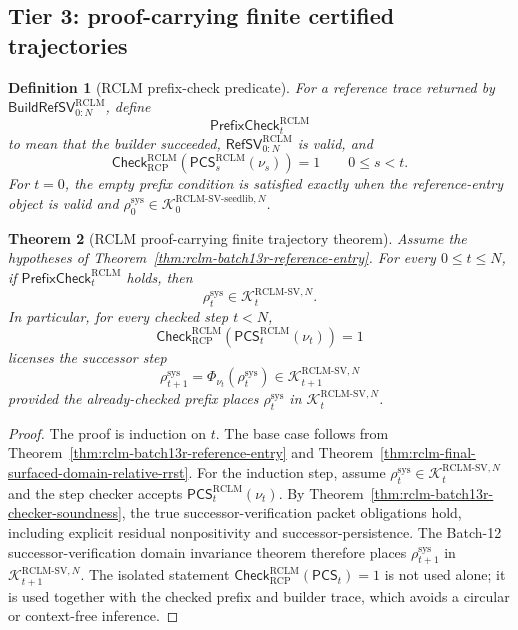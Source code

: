 \documentclass[11pt,a4paper]{article}
\newtheorem{theorem}{Theorem}[section]
\newtheorem{definition}[theorem]{Definition}
\newcommand{\Kcal}{\mathcal K}
\newcommand{\RCP}{\mathrm{RCP}}
\newcommand{\RCLM}{\mathrm{RCLM}}
\newcommand{\sys}{\mathrm{sys}}
\begin{document}
\subsection{Tier 3: proof-carrying finite certified trajectories}

\begin{definition}[RCLM prefix-check predicate]
\label{def:rclm-batch13r-prefix-check}
For a reference trace returned by \(\mathsf{BuildRefSV}_{0:N}^{\RCLM}\), define
\[
\mathsf{PrefixCheck}_t^{\RCLM}
\]
to mean that the builder succeeded, \(\mathsf{RefSV}_{0:N}^{\RCLM}\) is valid, and
\[
\mathsf{Check}_{\RCP}^{\RCLM}(\mathsf{PCS}_s^{\RCLM}(\nu_s))=1
\qquad
0\le s<t.
\]
For \(t=0\), the empty prefix condition is satisfied exactly when the reference-entry object is valid and \(\rho_0^{\sys}\in\Kcal_0^{\RCLM\text{-}\mathrm{SV\mbox{-}seedlib},N}\).
\end{definition}

\begin{theorem}[RCLM proof-carrying finite trajectory theorem]
\label{thm:rclm-batch13r-proof-carrying-finite-trajectory}
Assume the hypotheses of Theorem~\ref{thm:rclm-batch13r-reference-entry}.  For every \(0\le t\le N\), if \(\mathsf{PrefixCheck}_t^{\RCLM}\) holds, then
\[
\rho_t^{\sys}
\in
\Kcal_t^{\RCLM\text{-}\mathrm{SV},N}.
\]
In particular, for every checked step \(t<N\),
\[
\mathsf{Check}_{\RCP}^{\RCLM}(\mathsf{PCS}_t^{\RCLM}(\nu_t))=1
\]
licenses the successor step
\[
\rho_{t+1}^{\sys}=\Phi_{\nu_t}(\rho_t^{\sys})
\in
\Kcal_{t+1}^{\RCLM\text{-}\mathrm{SV},N}
\]
provided the already-checked prefix places \(\rho_t^{\sys}\) in \(\Kcal_t^{\RCLM\text{-}\mathrm{SV},N}\).
\end{theorem}

\begin{proof}
The proof is induction on \(t\).  The base case follows from Theorem~\ref{thm:rclm-batch13r-reference-entry} and Theorem~\ref{thm:rclm-final-surfaced-domain-relative-rrst}.  For the induction step, assume \(\rho_t^{\sys}\in\Kcal_t^{\RCLM\text{-}\mathrm{SV},N}\) and the step checker accepts \(\mathsf{PCS}_t^{\RCLM}(\nu_t)\).  By Theorem~\ref{thm:rclm-batch13r-checker-soundness}, the true successor-verification packet obligations hold, including explicit residual nonpositivity and successor-persistence.  The Batch-12 successor-verification domain invariance theorem therefore places \(\rho_{t+1}^{\sys}\) in \(\Kcal_{t+1}^{\RCLM\text{-}\mathrm{SV},N}\).  The isolated statement \(\mathsf{Check}_{\RCP}^{\RCLM}(\mathsf{PCS}_t)=1\) is not used alone; it is used together with the checked prefix and builder trace, which avoids a circular or context-free inference.
\end{proof}
\end{document}
